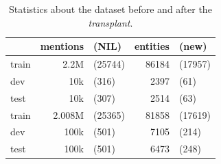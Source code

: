 \begin{table}[htbp]
    \centering
    \caption{Statistics about the dataset before and after the \textit{transplant}.}
    \label{tab:dataset_nils}
    \begin{tabular}{l|rl|rl}
    & mentions & (NIL) & entities & (new) \\
    \hline
        train & 2.2M & (25744)  & 86184 & (17957) \\
        dev   & 10k  & (316)    & 2397  & (61) \\
        test  & 10k  &(307)     & 2514  & (63) \\
        \hline
       train & 2.008M & (25365)  & 81858 & (17619) \\
       dev   & 100k   & (501)     & 7105 & (214) \\
       test  & 100k   & (501)     & 6473 & (248) \\
    \end{tabular}
\end{table}
\vspace{-20pt}

